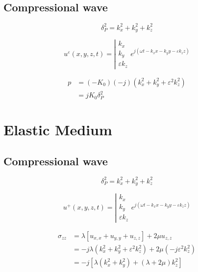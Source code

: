 \documentclass[11pt,A4paper]{book}
\renewcommand{\:}{\tb{:}}
\newcommand{\eps}{\varepsilon}
\begin{document}
\subsection{Compressional wave}


\begin{equation}
	\delta_P^2=k_x^2+k_y^2+k_z^2
\end{equation}

\begin{equation}
u^{\eps}(x,y,z,t)=\left| 
\begin{array}{c}
{k_x}\\
{k_y}\\
{\eps k_z}
\end{array}
\right.
e^{j(\omega t- k_x x-k_y y-\eps k_z z)}
\end{equation}

\begin{align}
p&=(-K_0)(-j) (k_x^2+k_y^2+\eps^2 k_z^2)\\
&=jK_0\delta_P^2
\end{align}

\section{Elastic Medium}

\subsection{Compressional wave}

\begin{equation}
	\delta_P^2=k_x^2+k_y^2+k_z^2
\end{equation}

\begin{equation}
u^{+}(x,y,z,t)=\left| 
\begin{array}{c}
{k_x}\\
{k_y}\\
{\eps k_z}
\end{array}
\right.
e^{j(\omega t- k_x x-k_y y-\eps k_z z)}
\end{equation}

\begin{align}
	\sigma_{zz}&=\lambda\left[
	u_{x,x}+u_{y,y}+u_{z,z}
	\right]+2\mu u_{z,z}\\
	&=-j\lambda(k_x^2+k_y^2+\eps^2k_z^2)+2\mu(-j\eps^2k_z^2)\\
	&=-j\left[\lambda(k_x^2+k_y^2)+(\lambda+2\mu)k_z^2 \right]
\end{align}
\end{document}
